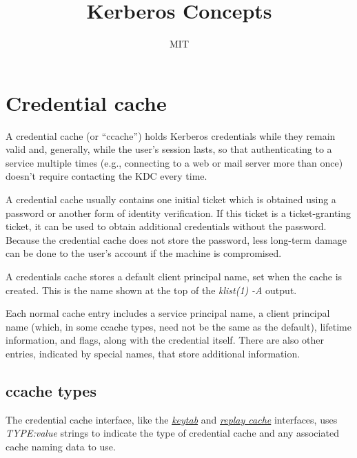 \documentclass[letterpaper,10pt,english]{sphinxmanual}
\title{Kerberos Concepts}
\date{ }
\author{MIT}
\begin{document}
\maketitle
\tableofcontents
{}\label{basic/index::doc}



\chapter{Credential cache}
\label{basic/ccache_def:basic-concepts}\label{basic/ccache_def::doc}\label{basic/ccache_def:credential-cache}\label{basic/ccache_def:ccache-definition}\label{basic/ccache_def:kerberos-v5-concepts}
A credential cache (or ``ccache'') holds Kerberos credentials while they
remain valid and, generally, while the user's session lasts, so that
authenticating to a service multiple times (e.g., connecting to a web
or mail server more than once) doesn't require contacting the KDC
every time.

A credential cache usually contains one initial ticket which is
obtained using a password or another form of identity verification.
If this ticket is a ticket-granting ticket, it can be used to obtain
additional credentials without the password.  Because the credential
cache does not store the password, less long-term damage can be done
to the user's account if the machine is compromised.

A credentials cache stores a default client principal name, set when
the cache is created.  This is the name shown at the top of the
\emph{klist(1)} \emph{-A} output.

Each normal cache entry includes a service principal name, a client
principal name (which, in some ccache types, need not be the same as
the default), lifetime information, and flags, along with the
credential itself.  There are also other entries, indicated by special
names, that store additional information.


\section{ccache types}
\label{basic/ccache_def:ccache-types}
The credential cache interface, like the {\hyperref[basic/keytab_def:keytab-definition]{\emph{keytab}}} and
{\hyperref[basic/rcache_def:rcache-definition]{\emph{replay cache}}} interfaces, uses \emph{TYPE:value} strings to
indicate the type of credential cache and any associated cache naming
data to use.
\end{document}
